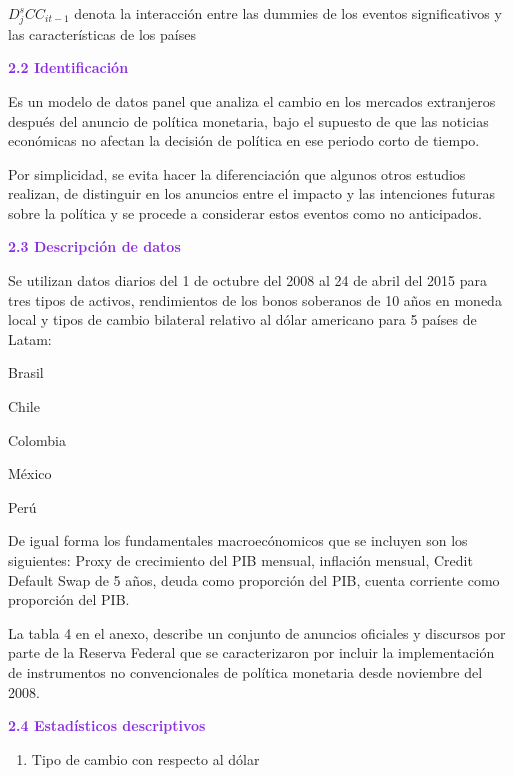 \documentclass[
  9.5pt,
]{article}
\providecommand{\tightlist}{%
  \setlength{\itemsep}{0pt}\setlength{\parskip}{0pt}}
\begin{document}
\(D_j^{s}CC_{it-1}\) denota la interacción entre las dummies de los
eventos significativos y las características de los países

\textbf{\textcolor{BlueViolet}{2.2   Identificación}}

Es un modelo de datos panel que analiza el cambio en los mercados
extranjeros después del anuncio de política monetaria, bajo el supuesto
de que las noticias económicas no afectan la decisión de política en ese
periodo corto de tiempo.

Por simplicidad, se evita hacer la diferenciación que algunos otros
estudios realizan, de distinguir en los anuncios entre el impacto y las
intenciones futuras sobre la política y se procede a considerar estos
eventos como no anticipados.

\textbf{\textcolor{BlueViolet}{2.3   Descripción de datos}}

Se utilizan datos diarios del 1 de octubre del 2008 al 24 de abril del
2015 para tres tipos de activos, rendimientos de los bonos soberanos de
10 años en moneda local y tipos de cambio bilateral relativo al dólar
americano para 5 países de Latam:


\begin{multiitem}
    \item Brasil
    \item Chile
    \item Colombia
    \item México
    \item Perú
\end{multiitem}

De igual forma los fundamentales macroecónomicos que se incluyen son los
siguientes: Proxy de crecimiento del PIB mensual, inflación mensual,
Credit Default Swap de 5 años, deuda como proporción del PIB, cuenta
corriente como proporción del PIB.

La tabla 4 en el anexo, describe un conjunto de anuncios oficiales y
discursos por parte de la Reserva Federal que se caracterizaron por
incluir la implementación de instrumentos no convencionales de política
monetaria desde noviembre del 2008.

\textbf{\textcolor{BlueViolet}{2.4   Estadísticos descriptivos}}

\begin{enumerate}
\def\labelenumi{\roman{enumi}.}
\tightlist
\item
  Tipo de cambio con respecto al dólar
\end{enumerate}
\end{document}
